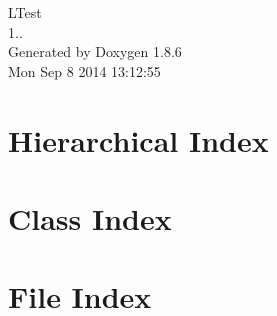\documentclass[twoside]{book}
\newcommand{\clearemptydoublepage}{%
  \newpage{\pagestyle{empty}\cleardoublepage}%
}
\begin{document}
\hypersetup{pageanchor=false}
\begin{titlepage}
\vspace*{7cm}
\begin{center}%
{\Large L\-Test \\[1ex]\large 1.. }\\
\vspace*{1cm}
{\large Generated by Doxygen 1.8.6}\\
\vspace*{0.5cm}
{\small Mon Sep 8 2014 13:12:55}\\
\end{center}
\end{titlepage}
\clearemptydoublepage
\tableofcontents
\clearemptydoublepage
{}
\hypersetup{pageanchor=true}

\chapter{Hierarchical Index}

\chapter{Class Index}

\chapter{File Index}

\end{document}
